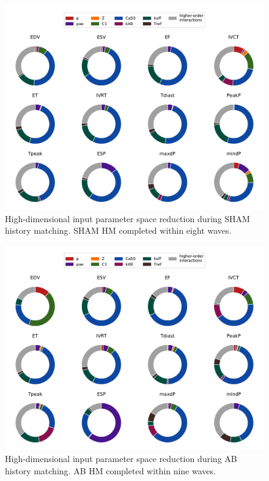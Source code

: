 \begin{figure}[!ht]
    \myfloatalign
    \includegraphics[width=\textwidth]{figures/chapter04/gsa_sham.pdf}
    \caption{High-dimensional input parameter space reduction during SHAM history matching. SHAM HM completed within eight waves.}
    \label{fig:shamgsa}
\end{figure}

\begin{figure}[!ht]
    \myfloatalign
    \includegraphics[width=\textwidth]{figures/chapter04/gsa_ab.pdf}
    \caption{High-dimensional input parameter space reduction during AB history matching. AB HM completed within nine waves.}
    \label{fig:abgsa}
\end{figure}

